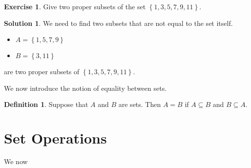 \documentclass[a4paper, 11pt]{report}
\theoremstyle{plain}
\theoremstyle{definition}
\newtheorem{defn}[thm]{Definition}
\newtheorem{exrc}[thm]{Exercise}
\newtheorem*{sltn}{Solution}
\begin{document}
\begin{exrc}
  Give two proper subsets of the set $\left\{ 1, 3, 5, 7, 9, 11 \right\}$.
\end{exrc}
\begin{sltn}
  We need to find two subsets that are not equal to the set itself.
  \begin{itemize}
    \item $A = \left\{ 1, 5, 7, 9 \right\}$
    \item $B = \left\{ 3, 11 \right\}$
  \end{itemize}
  are two proper subsets of $\left\{ 1, 3, 5, 7, 9, 11 \right\}$.
\end{sltn}

We now introduce the notion of equality between sets.
\begin{defn}
  Suppose that $A$ and $B$ are sets. Then $A = B$ if $A \subseteq B$ and $B \subseteq A$.
\end{defn}

\section{Set Operations}
\label{sec:set_operations}

We now 



\printindex
\end{document}

